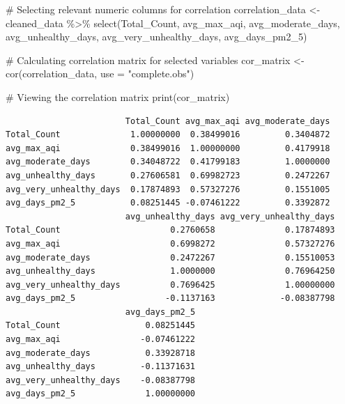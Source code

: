 \documentclass[
  12pt,
]{article}
\newenvironment{Shaded}{\begin{snugshade}}{\end{snugshade}}
\newcommand{\AttributeTok}[1]{\textcolor[rgb]{0.40,0.45,0.13}{#1}}
\newcommand{\CommentTok}[1]{\textcolor[rgb]{0.37,0.37,0.37}{#1}}
\newcommand{\FunctionTok}[1]{\textcolor[rgb]{0.28,0.35,0.67}{#1}}
\newcommand{\NormalTok}[1]{\textcolor[rgb]{0.00,0.23,0.31}{#1}}
\newcommand{\OtherTok}[1]{\textcolor[rgb]{0.00,0.23,0.31}{#1}}
\newcommand{\SpecialCharTok}[1]{\textcolor[rgb]{0.37,0.37,0.37}{#1}}
\newcommand{\StringTok}[1]{\textcolor[rgb]{0.13,0.47,0.30}{#1}}
\begin{document}
\begin{Shaded}
\begin{Highlighting}[]
\CommentTok{\# Selecting relevant numeric columns for correlation}
\NormalTok{correlation\_data }\OtherTok{\textless{}{-}}\NormalTok{ cleaned\_data }\SpecialCharTok{\%\textgreater{}\%}
  \FunctionTok{select}\NormalTok{(Total\_Count, avg\_max\_aqi, avg\_moderate\_days, avg\_unhealthy\_days, avg\_very\_unhealthy\_days, avg\_days\_pm2\_5)}

\CommentTok{\# Calculating correlation matrix for selected variables}
\NormalTok{cor\_matrix }\OtherTok{\textless{}{-}} \FunctionTok{cor}\NormalTok{(correlation\_data, }\AttributeTok{use =} \StringTok{"complete.obs"}\NormalTok{)}

\CommentTok{\# Viewing the correlation matrix}
\FunctionTok{print}\NormalTok{(cor\_matrix)}
\end{Highlighting}
\end{Shaded}

\begin{verbatim}
                        Total_Count avg_max_aqi avg_moderate_days
Total_Count              1.00000000  0.38499016         0.3404872
avg_max_aqi              0.38499016  1.00000000         0.4179918
avg_moderate_days        0.34048722  0.41799183         1.0000000
avg_unhealthy_days       0.27606581  0.69982723         0.2472267
avg_very_unhealthy_days  0.17874893  0.57327276         0.1551005
avg_days_pm2_5           0.08251445 -0.07461222         0.3392872
                        avg_unhealthy_days avg_very_unhealthy_days
Total_Count                      0.2760658              0.17874893
avg_max_aqi                      0.6998272              0.57327276
avg_moderate_days                0.2472267              0.15510053
avg_unhealthy_days               1.0000000              0.76964250
avg_very_unhealthy_days          0.7696425              1.00000000
avg_days_pm2_5                  -0.1137163             -0.08387798
                        avg_days_pm2_5
Total_Count                 0.08251445
avg_max_aqi                -0.07461222
avg_moderate_days           0.33928718
avg_unhealthy_days         -0.11371631
avg_very_unhealthy_days    -0.08387798
avg_days_pm2_5              1.00000000
\end{verbatim}
\end{document}
